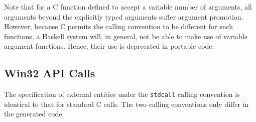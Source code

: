 Note that for a C function defined to accept a variable number of arguments,
all arguments beyond the explicitly typed arguments suffer argument promotion.
However, because C permits the calling convention to be different for such
functions, a Haskell system will, in general, not be able to make use of
variable argument functions.  Hence, their use is deprecated in portable code.


\subsection{Win32 API Calls}

The specification of external entities under the \mbox{\tt stdcall} calling
convention is identical to that for standard C calls.  The two calling
conventions only differ in the generated code.


% 
% 
% 
% 
% 
% 
% 
% 
% 
% 


